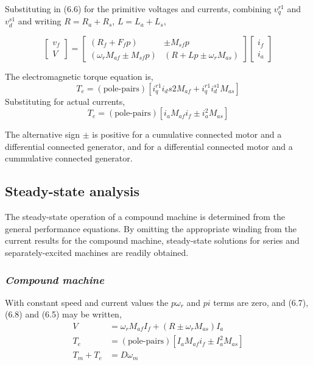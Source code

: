\documentclass[a4paper,numbers=noenddot,12pt]{scrbook}
\begin{document}
        Substituting in (6.6) for the primitive voltages and currents, combining $v_q^{r1}$ and $v_d^{s1}$ and writing $R = R_a + R_s$, $L = L_a + L_s$,

        \begin{equation}
            \begin{bmatrix}
                v_f \\[2ex] V
            \end{bmatrix} =
            \begin{bmatrix}
                (R_f +F_f p) & \pm M_{sf} p \\[2ex]
                (\omega_r M_{af} \pm M_{sf} p) & (R + L p \pm \omega_r M_{as})
            \end{bmatrix}
            \begin{bmatrix}
                i_f \\[2ex] i_a
            \end{bmatrix}
            \label{}
        \end{equation}

        The electromagnetic torque equation is,
        \begin{equation*}
            T_e = (\text{pole-pairs})[i_q^{r1} i_d{s2} M_{af} + i_q^{r1} i_d^{s1} M_{as}]
        \end{equation*}
        Substituting for actual currents,
        \begin{equation}
            T_e = (\text{pole-pairs})[i_a M_{af} i_f \pm i_a^{2} M_{as}]
            \label{}
        \end{equation}

        The alternative sign $\pm$ is positive for a cumulative connected motor and a differential connected generator, and for a differential connected motor and a cummulative connected generator.

        \subsection{Steady-state analysis}
        The steady-state operation of a compound machine is determined from the general performance equations. By omitting the appropriate winding from the current results for the compound machine, steady-state solutions for series and separately-excited machines are readily obtained.

        \subsubsection{\textit{Compound machine}}
        With constant speed and current values the $p \omega_r$ and $p i$ terms are zero, and (6.7), (6.8) and (6.5) may be written,
        \begin{align}
            V & =\omega_r M_{af} I_f + (R \pm \omega_r M_{as}) I_a \\[2ex]
            T_e & = (\text{pole-pairs})[I_a M_{af} i_f \pm I_a^2 M_{as}] \\[2ex]
            T_m + T_e & = D \omega_m
        \end{align}
\end{document}
